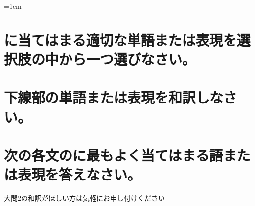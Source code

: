 \documentclass[a4paper]{ltjsarticle}
\begin{document}
\leftskip=1em

\section{\blank に当てはまる適切な単語または表現を選択肢の中から一つ選びなさい。}

\section{下線部の単語または表現を和訳しなさい。}
% 
% 
% 
% 
% 
% 
% 
% 
% 
% 
% 
% 
% 
% 
% 
% 
% 
% 
% 
% 

\section{次の各文の\blank に最もよく当てはまる語または表現を答えなさい。}
% 
% 
% 
% 
% 
%
{\color{\anscolor} 大問2の和訳がほしい方は気軽にお申し付けください}
\addtocounter{correct}{-1}
\end{document}
